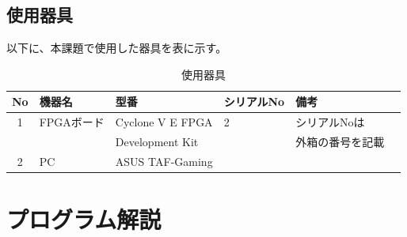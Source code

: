 \documentclass{ltjsarticle}
\begin{document}
	\subsection{使用器具}
		以下に、本課題で使用した器具を表に示す。
	\begin{table}[H]
	\begin{center}
	\caption{使用器具}
	\label{tab:used}
	\begin{tabular}{clllll} \toprule
	No&\multicolumn{1}{l}{機器名}&\multicolumn{1}{l}{型番}&\multicolumn{1}{l}{シリアルNo}&\multicolumn{1}{l}{備考}\\ \hline
	1&FPGAボード&Cyclone V E FPGA&2&シリアルNoは\\
	&&Development Kit&&外箱の番号を記載\\
	2&PC&ASUS TAF-Gaming&&\\
	\bottomrule
	\end{tabular}
	\end{center}
	\end{table}

\clearpage
\section{プログラム解説}
\end{document}
